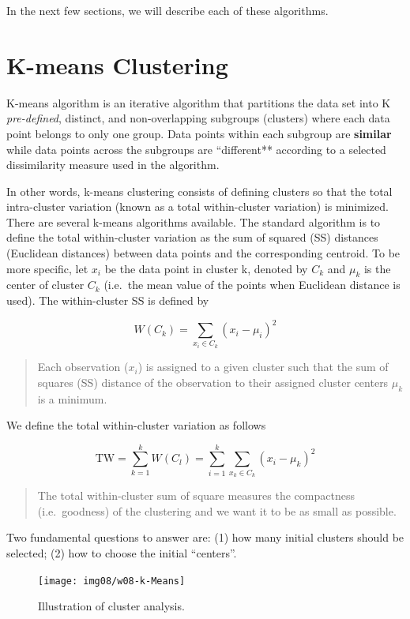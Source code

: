 \documentclass[
]{book}
\begin{document}
In the next few sections, we will describe each of these algorithms.

\hypertarget{k-means-clustering}{%
\section{K-means Clustering}\label{k-means-clustering}}

K-means algorithm is an iterative algorithm that partitions the data set into K \emph{pre-defined}, distinct, and non-overlapping subgroups (clusters) where each data point belongs to only one group. Data points within each subgroup are \textbf{similar} while data points across the subgroups are ``different** according to a selected dissimilarity measure used in the algorithm.

In other words, k-means clustering consists of defining clusters so that the total intra-cluster variation (known as a total within-cluster variation) is minimized. There are several k-means algorithms available. The standard algorithm is to define the total within-cluster variation as the sum of squared (SS) distances (Euclidean distances) between data points and the corresponding centroid. To be more specific, let \(x_i\) be the data point in cluster k, denoted by \(C_k\) and \(\mu_k\) is the center of cluster \(C_k\) (i.e.~the mean value of the points when Euclidean distance is used). The within-cluster SS is defined by

\[
W(C_k) = \sum_{x_i\in C_k} (x_i - \mu_i)^2
\]

\begin{quote}
Each observation (\(x_i\)) is assigned to a given cluster such that the sum of squares (SS) distance of the observation to their assigned cluster centers \(\mu_k\) is a minimum.
\end{quote}

We define the total within-cluster variation as follows

\[
\mbox{TW} = \sum_{k=1}^k W(C_l) = \sum_{i=1}^k\sum_{x_k\in C_k}(x_i - \mu_k)^2
\]

\begin{quote}
The total within-cluster sum of square measures the compactness (i.e.~goodness) of the clustering and we want it to be as small as possible.
\end{quote}

Two fundamental questions to answer are: (1) how many initial clusters should be selected; (2) how to choose the initial ``centers''.

\begin{figure}

{\centering \texttt{[image: img08/w08-k-Means]} 

}

\caption{Illustration of cluster analysis.}\label{fig:unnamed-chunk-191}
\end{figure}
\end{document}
